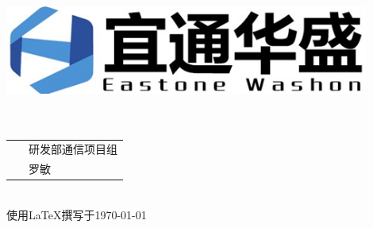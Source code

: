 \documentclass[a4paper,12pt]{report}
\begin{document}
\begin{titlepage}
	\begin{center}
		
    \includegraphics[width=0.9\textwidth]{figure//etws.png}\\
    \vspace{10mm}
    \textbf{}\\[0.8cm]
    \textbf{}\\[3cm]
    
	\vspace{\fill}
	
\setlength{\extrarowheight}{3mm}
{\songti{}	
\begin{tabular}{rl}
	
	{\makebox[4\ccwd][s]{部\qquad 门：}}& ~\kaishu 研发部通信项目组\\
	
	{\makebox[4\ccwd][s]{姓\qquad 名：}}& ~\kaishu 罗敏 \\ 

\end{tabular}
 }\\[2cm]
\vspace{\fill}
使用\LaTeX 撰写于\today
	\end{center}	
\end{titlepage}

\begin{abstract}
\begin{spacing}{1.5}
	{
	无人机集群是一个新的应用领域，特别是在军事领域,将会引发一场革命性的变革，而多机之间的通信又是无人机集群飞行之中的关键，如何实现
	更好的无几人集群之间的组网是一个需要深入研究和实验的方向。因应用领域的特殊性，真实环境采集数据测试具有很大的困难且花费大，因而需
	要预先实验仿真，本文档主要是仿真无人机集群使用olsr协议进行自组网通信,并评估olsr协议在组网过程中的各项性能指标和参数，为后续改进
	协议做参考。
	
	\textbf{关键字}：\quad 仿真 \quad 无人机集群 \quad olsr \quad 性能
	}
\end{spacing}
\end{abstract}
\end{document}
